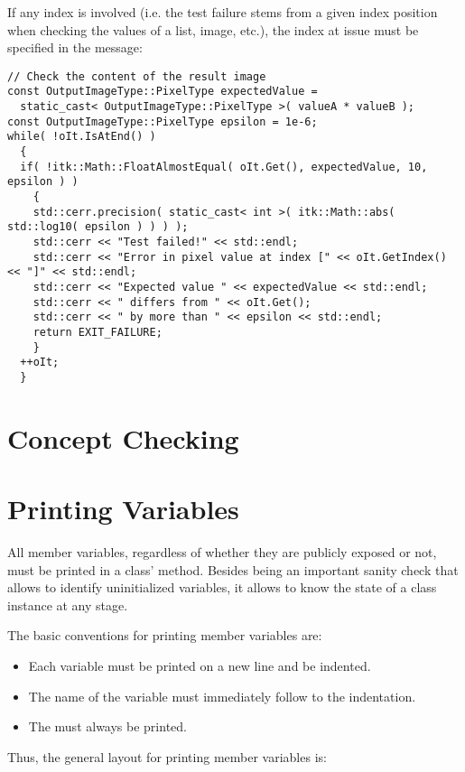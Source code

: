 If any index is involved (i.e. the test failure stems from a given index
position when checking the values of a list, image, etc.), the index at issue
must be specified in the message:

\small
\begin{verbatim}
// Check the content of the result image
const OutputImageType::PixelType expectedValue =
  static_cast< OutputImageType::PixelType >( valueA * valueB );
const OutputImageType::PixelType epsilon = 1e-6;
while( !oIt.IsAtEnd() )
  {
  if( !itk::Math::FloatAlmostEqual( oIt.Get(), expectedValue, 10, epsilon ) )
    {
    std::cerr.precision( static_cast< int >( itk::Math::abs( std::log10( epsilon ) ) ) );
    std::cerr << "Test failed!" << std::endl;
    std::cerr << "Error in pixel value at index [" << oIt.GetIndex() << "]" << std::endl;
    std::cerr << "Expected value " << expectedValue << std::endl;
    std::cerr << " differs from " << oIt.Get();
    std::cerr << " by more than " << epsilon << std::endl;
    return EXIT_FAILURE;
    }
  ++oIt;
  }
\end{verbatim}
\normalsize


\section{Concept Checking}
\label{sec:ConceptChecking}


\section{Printing Variables}
\label{sec:PrintingVariables}

All member variables, regardless of whether they are publicly exposed or not,
must be printed in a class'  method. Besides being an
important sanity check that allows to identify uninitialized variables, it
allows to know the state of a class instance at any stage.

The basic conventions for printing member variables are:
\begin{itemize}
\item Each variable must be printed on a new line and be indented.
\item The name of the variable must immediately follow to the indentation.
\item The  must always be printed.
\end{itemize}

Thus, the general layout for printing member variables is:

